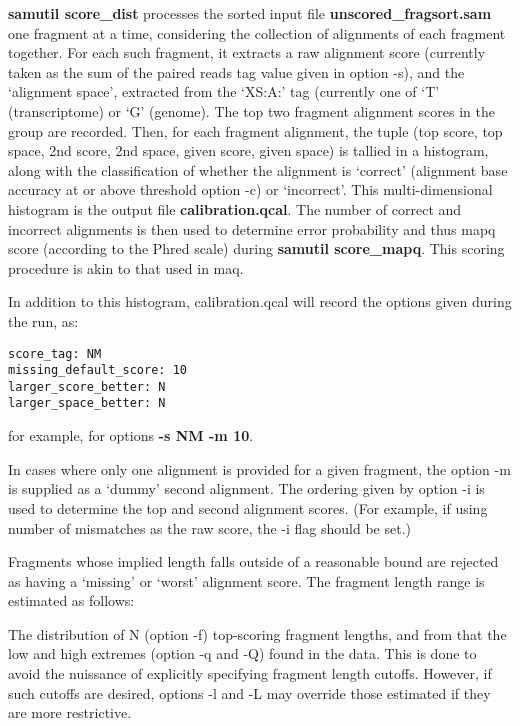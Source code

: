 \documentclass[10pt]{article}
\begin{document}
\textbf{samutil score\_dist} processes the sorted input file
\textbf{unscored\_fragsort.sam} one fragment at a time, considering the
collection of alignments of each fragment together. For each such
fragment, it extracts a raw alignment score (currently taken as the
sum of the paired reads tag value given in option -s), and the
`alignment space', extracted from the `XS:A:' tag (currently one of
`T' (transcriptome) or `G' (genome). The top two fragment alignment
scores in the group are recorded. Then, for each fragment alignment,
the tuple (top score, top space, 2nd score, 2nd space, given score,
given space) is tallied in a histogram, along with the classification
of whether the alignment is `correct' (alignment base accuracy at or
above threshold option -c) or `incorrect'. This multi-dimensional
histogram is the output file \textbf{calibration.qcal}. The number of correct
and incorrect alignments is then used to determine error probability
and thus mapq score (according to the Phred scale) during
\textbf{samutil score\_mapq}. This scoring procedure is akin to that
used in maq.

In addition to this histogram, calibration.qcal will record the
options given during the run, as:

{\small
\begin{verbatim}
score_tag: NM
missing_default_score: 10
larger_score_better: N
larger_space_better: N
\end{verbatim}
}

for example, for options \textbf{-s NM -m 10}.

In cases where only one alignment is provided for a given fragment,
the option -m is supplied as a `dummy' second alignment. The ordering
given by option -i is used to determine the top and second alignment
scores. (For example, if using number of mismatches as the raw score,
the -i flag should be set.)

Fragments whose implied length falls outside of a reasonable bound are
rejected as having a `missing' or `worst' alignment score. The
fragment length range is estimated as follows:

The distribution of N (option -f) top-scoring fragment lengths, and
from that the low and high extremes (option -q and -Q) found in the
data. This is done to avoid the nuissance of explicitly specifying
fragment length cutoffs. However, if such cutoffs are desired, options
-l and -L may override those estimated if they are more restrictive.
\end{document}
